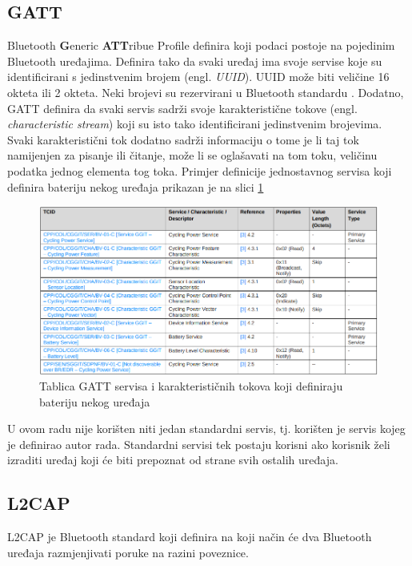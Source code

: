 \documentclass[times, utf8, diplomski]{diplomski}
\begin{document}
\subsection{GATT}
Bluetooth \textbf{G}eneric \textbf{ATT}ribue Profile definira koji podaci postoje na pojedinim Bluetooth uređajima. Definira tako da svaki uređaj ima svoje servise koje su identificirani s jedinstvenim brojem (engl. \textit{UUID}). UUID može biti veličine 16 okteta ili 2 okteta. Neki brojevi su rezervirani u Bluetooth standardu \cite{core41}.
Dodatno, GATT definira da svaki servis sadrži svoje karakteristične tokove (engl. \textit{characteristic stream}) koji su isto tako identificirani jedinstvenim brojevima. Svaki karakteristični tok dodatno sadrži informaciju o tome je li taj tok namijenjen za pisanje ili čitanje, može li se oglašavati na tom toku, veličinu podatka jednog elementa tog toka. Primjer definicije jednostavnog servisa koji definira bateriju nekog uređaja prikazan je na slici \ref{fig:gattexample}

\begin{figure}[H]
\includegraphics[width=\textwidth]{examplegatt_20230623_212042.png}
\centering
\caption{Tablica GATT servisa i karakterističnih tokova koji definiraju bateriju nekog uređaja}
\label{fig:gattexample}
\end{figure}

U ovom radu nije korišten niti jedan standardni servis, tj. korišten je servis kojeg je definirao autor rada. Standardni servisi tek postaju korisni ako korisnik želi izraditi uređaj koji će biti prepoznat od strane svih ostalih uređaja.

\subsection{L2CAP}
L2CAP je Bluetooth standard koji definira na koji način će dva Bluetooth uređaja razmjenjivati poruke na razini poveznice.
\end{document}
